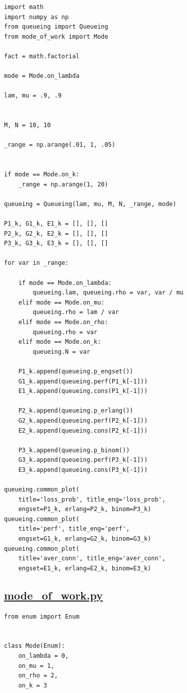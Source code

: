 \documentclass[12pt]{article}
\newcommand\purl[1]{\protect\url{#1}} %
\let\Oldsubsection\subsection
\renewcommand{\subsection}{\FloatBarrier\Oldsubsection}
\begin{document}
\begin{lstlisting}
import math
import numpy as np
from queueing import Queueing
from mode_of_work import Mode

fact = math.factorial

mode = Mode.on_lambda

lam, mu = .9, .9


M, N = 10, 10

_range = np.arange(.01, 1, .05)


if mode == Mode.on_k:
    _range = np.arange(1, 20)

queueing = Queueing(lam, mu, M, N, _range, mode)

P1_k, G1_k, E1_k = [], [], []
P2_k, G2_k, E2_k = [], [], []
P3_k, G3_k, E3_k = [], [], []

for var in _range:

    if mode == Mode.on_lambda:
        queueing.lam, queueing.rho = var, var / mu
    elif mode == Mode.on_mu:
        queueing.rho = lam / var
    elif mode == Mode.on_rho:
        queueing.rho = var
    elif mode == Mode.on_k:
        queueing.N = var

    P1_k.append(queueing.p_engset())
    G1_k.append(queueing.perf(P1_k[-1]))
    E1_k.append(queueing.cons(P1_k[-1]))

    P2_k.append(queueing.p_erlang())
    G2_k.append(queueing.perf(P2_k[-1]))
    E2_k.append(queueing.cons(P2_k[-1]))

    P3_k.append(queueing.p_binom())
    G3_k.append(queueing.perf(P3_k[-1]))
    E3_k.append(queueing.cons(P3_k[-1]))

queueing.common_plot(
    title='loss_prob', title_eng='loss_prob',
    engset=P1_k, erlang=P2_k, binom=P3_k)
queueing.common_plot(
    title='perf', title_eng='perf',
    engset=G1_k, erlang=G2_k, binom=G3_k)
queueing.common_plot(
    title='aver_conn', title_eng='aver_conn',
    engset=E1_k, erlang=E2_k, binom=E3_k)

\end{lstlisting}

\subsection{\purl{mode_of_work.py}}
\begin{lstlisting}
from enum import Enum


class Mode(Enum):
    on_lambda = 0,
    on_mu = 1,
    on_rho = 2,
    on_k = 3
\end{lstlisting}
\end{document}
